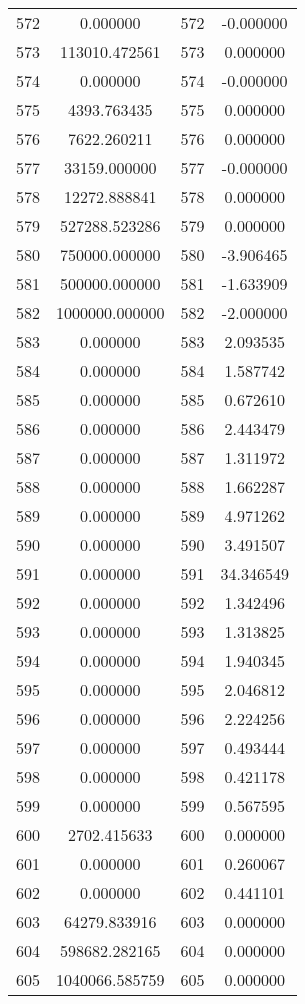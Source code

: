 \documentclass[12pt]{article}
\begin{document}
\begin{longtable}{@{}cccc@{}}
572 & 0.000000 & 572 & -0.000000 \\
573 & 113010.472561 & 573 & 0.000000 \\
574 & 0.000000 & 574 & -0.000000 \\
575 & 4393.763435 & 575 & 0.000000 \\
576 & 7622.260211 & 576 & 0.000000 \\
577 & 33159.000000 & 577 & -0.000000 \\
578 & 12272.888841 & 578 & 0.000000 \\
579 & 527288.523286 & 579 & 0.000000 \\
580 & 750000.000000 & 580 & -3.906465 \\
581 & 500000.000000 & 581 & -1.633909 \\
582 & 1000000.000000 & 582 & -2.000000 \\
583 & 0.000000 & 583 & 2.093535 \\
584 & 0.000000 & 584 & 1.587742 \\
585 & 0.000000 & 585 & 0.672610 \\
586 & 0.000000 & 586 & 2.443479 \\
587 & 0.000000 & 587 & 1.311972 \\
588 & 0.000000 & 588 & 1.662287 \\
589 & 0.000000 & 589 & 4.971262 \\
590 & 0.000000 & 590 & 3.491507 \\
591 & 0.000000 & 591 & 34.346549 \\
592 & 0.000000 & 592 & 1.342496 \\
593 & 0.000000 & 593 & 1.313825 \\
594 & 0.000000 & 594 & 1.940345 \\
595 & 0.000000 & 595 & 2.046812 \\
596 & 0.000000 & 596 & 2.224256 \\
597 & 0.000000 & 597 & 0.493444 \\
598 & 0.000000 & 598 & 0.421178 \\
599 & 0.000000 & 599 & 0.567595 \\
600 & 2702.415633 & 600 & 0.000000 \\
601 & 0.000000 & 601 & 0.260067 \\
602 & 0.000000 & 602 & 0.441101 \\
603 & 64279.833916 & 603 & 0.000000 \\
604 & 598682.282165 & 604 & 0.000000 \\
605 & 1040066.585759 & 605 & 0.000000 \\

\end{longtable}
\end{document}
